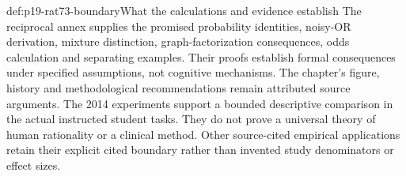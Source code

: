 \begin{proofboundary}{def:p19-rat73-boundary}{What the calculations and evidence establish}
The reciprocal annex supplies the promised probability identities,
noisy-OR derivation, mixture distinction, graph-factorization consequences,
odds calculation and separating examples. Their proofs establish formal
consequences under specified assumptions, not cognitive mechanisms.
The chapter's figure, history and methodological recommendations remain
attributed source arguments. The 2014 experiments support a bounded
descriptive comparison in the actual instructed student tasks. They do
not prove a universal theory of human rationality or a clinical method.
Other source-cited empirical applications retain their explicit cited
boundary rather than invented study denominators or effect sizes.
\end{proofboundary}

